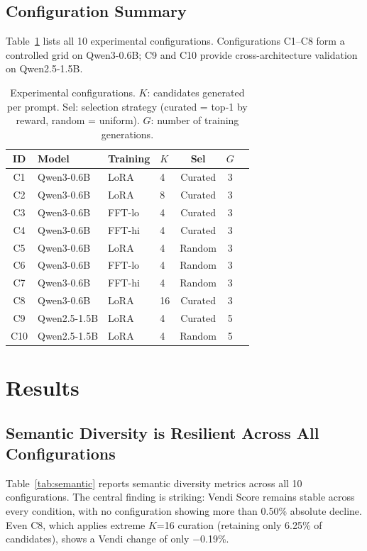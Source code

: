 \documentclass[11pt,a4paper]{article}
\begin{document}
\subsection{Configuration Summary}

Table~\ref{tab:configs} lists all 10 experimental configurations. Configurations C1--C8 form a controlled grid on Qwen3-0.6B; C9 and C10 provide cross-architecture validation on Qwen2.5-1.5B.

\begin{table}[t]
\centering
\caption{Experimental configurations. $K$: candidates generated per prompt. Sel: selection strategy (curated = top-1 by reward, random = uniform). $G$: number of training generations.}
\label{tab:configs}
\footnotesize
\begin{tabular}{clllccc}
\toprule
ID & Model & Training & $K$ & Sel & $G$ \\
\midrule
C1 & Qwen3-0.6B & LoRA & 4 & Curated & 3 \\
C2 & Qwen3-0.6B & LoRA & 8 & Curated & 3 \\
C3 & Qwen3-0.6B & FFT-lo & 4 & Curated & 3 \\
C4 & Qwen3-0.6B & FFT-hi & 4 & Curated & 3 \\
C5 & Qwen3-0.6B & LoRA & 4 & Random & 3 \\
C6 & Qwen3-0.6B & FFT-lo & 4 & Random & 3 \\
C7 & Qwen3-0.6B & FFT-hi & 4 & Random & 3 \\
C8 & Qwen3-0.6B & LoRA & 16 & Curated & 3 \\
\midrule
C9 & Qwen2.5-1.5B & LoRA & 4 & Curated & 5 \\
C10 & Qwen2.5-1.5B & LoRA & 4 & Random & 5 \\
\bottomrule
\end{tabular}
\end{table}

\section{Results}

\subsection{Semantic Diversity is Resilient Across All Configurations}
\label{sec:semantic}

Table~\ref{tab:semantic} reports semantic diversity metrics across all 10 configurations. The central finding is striking: Vendi Score remains stable across every condition, with no configuration showing more than 0.50\% absolute decline. Even C8, which applies extreme $K$=16 curation (retaining only 6.25\% of candidates), shows a Vendi change of only $-$0.19\%.
\end{document}
